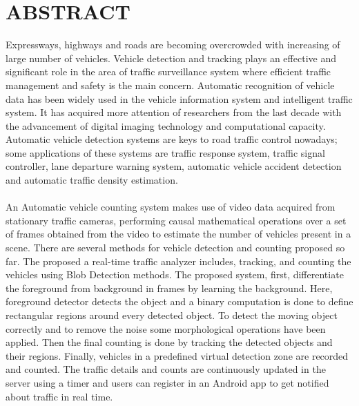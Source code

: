 \chapter*{\rm \large \bf ABSTRACT}
\vspace{4.0mm}
\setlength{\parindent}{4em}

\par Expressways, highways and roads are becoming overcrowded with increasing of large number of vehicles. Vehicle detection and tracking plays an effective and significant role in the area of traffic surveillance system where efficient traffic management and safety is the main concern. Automatic recognition of vehicle data has been widely used in the vehicle information system and intelligent traffic system. It has acquired more attention of researchers from the last decade with the advancement of digital imaging technology and computational capacity.  Automatic vehicle detection systems are keys to road traffic control nowadays; some applications of these systems are traffic response system, traffic signal controller, lane departure warning system, automatic vehicle accident detection and automatic traffic density estimation. \\ \\

An Automatic vehicle counting system makes use of video data acquired from stationary traffic cameras, performing causal mathematical operations over a set of frames obtained from the video to estimate the number of vehicles present in a scene. There are several methods for vehicle detection and counting proposed so far. The proposed a real-time traffic analyzer includes, tracking, and counting the vehicles using Blob Detection methods. The proposed system, first, differentiate the foreground from background in frames by learning the background. Here, foreground detector detects the object and a binary computation is done to define rectangular regions around every detected object. To detect the moving object correctly and to remove the noise some morphological operations have been applied. Then the final counting is done by tracking the detected objects and their regions. Finally, vehicles in a predefined virtual detection zone are recorded and counted. The traffic details and counts are continuously updated in the server using a timer and users can register in an Android app to get notified about traffic in real time. 

\newpage 
